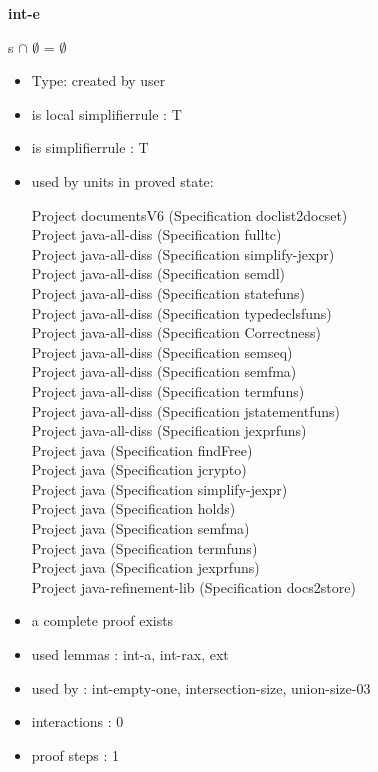 \documentclass[a4paper]{article}
\begin{document}
{\LARGE\bf int-e}\label{lemma-int-e}

\medskip

 \Fol s $\cap$ $\emptyset$ = $\emptyset$

\begin{itemize}

\item Type: created by user

\item is local simplifierrule : T
\item is simplifierrule : T
\item used by units in proved state:

Project documentsV6 (Specification doclist2docset) \\
Project java-all-diss (Specification fulltc) \\
Project java-all-diss (Specification simplify-jexpr) \\
Project java-all-diss (Specification semdl) \\
Project java-all-diss (Specification statefuns) \\
Project java-all-diss (Specification typedeclsfuns) \\
Project java-all-diss (Specification Correctness) \\
Project java-all-diss (Specification semseq) \\
Project java-all-diss (Specification semfma) \\
Project java-all-diss (Specification termfuns) \\
Project java-all-diss (Specification jstatementfuns) \\
Project java-all-diss (Specification jexprfuns) \\
Project java (Specification findFree) \\
Project java (Specification jcrypto) \\
Project java (Specification simplify-jexpr) \\
Project java (Specification holds) \\
Project java (Specification semfma) \\
Project java (Specification termfuns) \\
Project java (Specification jexprfuns) \\
Project java-refinement-lib (Specification docs2store)
\item       a complete proof exists
\item       used lemmas  : int-a, int-rax, ext
\item       used by      : int-empty-one, intersection-size, union-size-03
\item       interactions : 0
\item       proof steps  : 1
\end{itemize}
\end{document}
